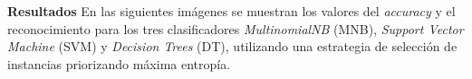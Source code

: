 
\vspace{3 mm}

\textbf{Resultados} En las siguientes imágenes se muestran los valores del \textit{accuracy} y el reconocimiento para los tres clasificadores \textit{MultinomialNB} (MNB), \textit{Support Vector Machine} (SVM) y \textit{Decision Trees} (DT), utilizando una estrategia de selección de instancias priorizando máxima entropía.

